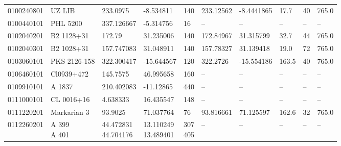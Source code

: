 \documentclass[fleqn,usenatbib]{mnras}
\begin{document}
\begin{table*}
\begin{tabular}{llllllllll}
         0100240801 &          UZ LIB &    233.0975 &   -8.534811 &                 140 &  233.12562 &  -8.4441865 &         17.7 &                  40 &               765.0 \\
         0100440101 &        PHL 5200 &  337.126667 &   -5.314756 &                  16 &         -- &          -- &           -- &                  -- &                  -- \\
         0102040201 &      B2 1128+31 &      172.79 &   31.235006 &                 140 &  172.84967 &   31.315799 &         32.7 &                  44 &               765.0 \\
         0102040301 &      B2 1028+31 &  157.747083 &   31.048911 &                 140 &  157.78327 &   31.139418 &         19.0 &                  72 &               765.0 \\
         0103060101 &    PKS 2126-158 &  322.300417 &  -15.644567 &                 120 &   322.2726 &  -15.554186 &        163.5 &                  40 &               765.0 \\
         0106460101 &      Cl0939+472 &    145.7575 &   46.995658 &                 160 &         -- &          -- &           -- &                  -- &                  -- \\
         0109910101 &          A 1837 &  210.402083 &   -11.12865 &                 440 &         -- &          -- &           -- &                  -- &                  -- \\
         0111000101 &      CL 0016+16 &    4.638333 &   16.435547 &                 148 &         -- &          -- &           -- &                  -- &                  -- \\
         0111220201 &     Markarian 3 &     93.9025 &   71.037764 &                  76 &  93.816661 &   71.125597 &        162.6 &                  32 &               765.0 \\
         0112260201 & \parbox{1cm}{\vspace{1.5mm} A 399 \\ A 401 \vspace{1.5mm}} & \parbox{2cm}{\vspace{1.5mm} 44.472831 \\ 44.704176 \vspace{1.5mm}} & \parbox{2cm}{\vspace{1.5mm} 13.110249 \\ 13.489401 \vspace{1.5mm}} & \parbox{1cm}{\vspace{1.5mm} 307 \\ 405 \vspace{1.5mm}} & -- & -- &           -- &                  -- &                  -- \\ 

\end{tabular}
\end{table*}
\end{document}
